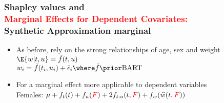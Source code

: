 \documentclass[11pt,dvipsnames,usenames,times]{beamer}
\newcommand*{\BART}{\mathrm{BART}\ }
\newcommand*{\red}[1]{\textcolor{red}{#1}}%
\newcommand*{\blue}[1]{\textcolor{blue}{#1}}%
\begin{document}
\begin{frame}\frametitle{\bf Shapley values and\\
\textcolor{red}{Marginal Effects for Dependent Covariates:}\\
Synthetic Approximation marginal}

\begin{itemize}
\item As before, rely on the strong
  relationships of age, sex and weight\\
  $\E{w|t, u}={\tilde{f}(t, u)}$\\
$w_i =\tilde{f}(t_i, u_i)+\tilde{\epsilon}_i \where \tilde{f} \prior \BART$
\item For a marginal effect more applicable to dependent variables\\
Females: $\mu+f_t(t)+f_u(\red{F})+2f_{t:u}(t, \red{F})+f_w({\widehat{w}(t, \red{F})})$
\end{itemize}

\end{frame}
\end{document}
